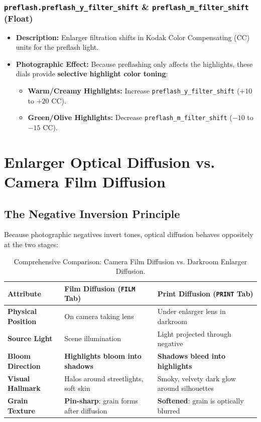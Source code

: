 \documentclass[11pt,a4paper]{article}
\begin{document}
\subsubsection{\texttt{preflash.preflash\_y\_filter\_shift} \& \texttt{preflash\_m\_filter\_shift} (Float)}
\begin{itemize}[leftmargin=*]
    \item \textbf{Description:} Enlarger filtration shifts in Kodak Color Compensating (CC) units for the preflash light.
    \item \textbf{Photographic Effect:} Because preflashing only affects the highlights, these dials provide \textbf{selective highlight color toning}:
    \begin{itemize}
        \item \textbf{Warm/Creamy Highlights:} Increase \texttt{preflash\_y\_filter\_shift} ($+10$ to $+20$ CC).
        \item \textbf{Green/Olive Highlights:} Decrease \texttt{preflash\_m\_filter\_shift} ($-10$ to $-15$ CC).
    \end{itemize}
\end{itemize}

\newpage

\section{Enlarger Optical Diffusion vs. Camera Film Diffusion}

\subsection{The Negative Inversion Principle}
Because photographic negatives invert tones, optical diffusion behaves oppositely at the two stages:

\begin{table}[h]
\centering
\small
\begin{tabularx}{\textwidth}{p{3.5cm}p{5.5cm}p{5.5cm}}
\toprule
\textbf{Attribute} & \textbf{Film Diffusion (\texttt{FILM} Tab)} & \textbf{Print Diffusion (\texttt{PRINT} Tab)} \\
\midrule
\textbf{Physical Position} & On camera taking lens & Under enlarger lens in darkroom \\
\textbf{Source Light} & Scene illumination & Light projected through negative \\
\textbf{Bloom Direction} & \textbf{Highlights bloom into shadows} & \textbf{Shadows bleed into highlights} \\
\textbf{Visual Hallmark} & Halos around streetlights, soft skin & Smoky, velvety dark glow around silhouettes \\
\textbf{Grain Texture} & \textbf{Pin-sharp}: grain forms after diffusion & \textbf{Softened}: grain is optically blurred \\
\bottomrule
\end{tabularx}
\caption{Comprehensive Comparison: Camera Film Diffusion vs. Darkroom Enlarger Diffusion.}
\end{table}
\end{document}
